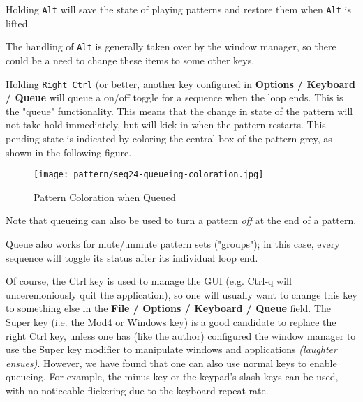    Holding \texttt{Alt} will save the state of playing patterns and restore
   them when \texttt{Alt} is lifted.

   The handling of \texttt{Alt} is generally taken over by the window
   manager, so there could be a need to change these items to some other
   keys.


	Holding \texttt{Right Ctrl} (or better, another key configured in
   \textbf{Options / Keyboard / Queue} will queue a on/off toggle for a 
	sequence when the loop ends. This is the "queue" functionality.
   This means that the change in state of the pattern will not take hold
   immediately, but will kick in when the pattern restarts.
   This pending state is indicated by coloring the central box of the
   pattern grey, as shown in the following figure.

\begin{figure}[H]
   \centering 
   \texttt{[image: pattern/seq24-queueing-coloration.jpg]}
   \caption{Pattern Coloration when Queued}
   \label{fig:seq64_queueing_coloration}
\end{figure}

   Note that queueing can also be used to turn a pattern \textsl{off}
   at the end of a pattern.

   Queue also works for mute/unmute pattern sets ("groups"); in this case,
   every sequence will toggle its status after its individual loop end. 

   Of course, the Ctrl key is used to manage the GUI (e.g. Ctrl-q will
   unceremoniously quit the application), so one will usually want to change
   this key to something else in the
   \textbf{File / Options / Keyboard / Queue} field.
   The Super key (i.e. the Mod4 or Windows key) is a good candidate to
   replace the right Ctrl key, unless one has (like the author) configured
   the window manager to use the Super key modifier to manipulate windows
   and applications \textsl{(laughter ensues)}.
   However, we have found that one can also use normal keys to enable queueing.
   For example, the minus key or the keypad's slash keys can be used, with no
   noticeable flickering due to the keyboard repeat rate.

